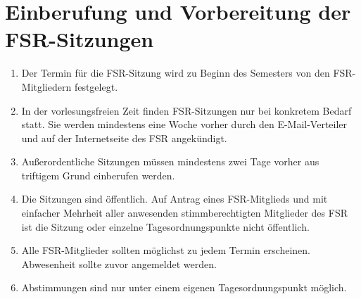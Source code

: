 \documentclass[
	a4paper,
	12pt,
	oneside,
	parskip=half-,
	pagesize,
	headsepline,
	german,
	ngerman
]{scrartcl}
\begin{document}
\section{Einberufung und Vorbereitung der FSR-Sitzungen}
\begin{enumerate}
	\item Der Termin für die FSR-Sitzung wird zu Beginn des Semesters von den FSR-Mitgliedern festgelegt.
	\item In der vorlesungsfreien Zeit finden FSR-Sitzungen nur bei konkretem Bedarf statt. Sie werden mindestens eine Woche vorher durch den E-Mail-Verteiler und auf der Internetseite des FSR angekündigt.
	\item Außerordentliche Sitzungen müssen mindestens zwei Tage vorher aus triftigem Grund einberufen werden. 
	\item Die Sitzungen sind öffentlich. Auf Antrag eines FSR-Mitglieds und mit einfacher Mehrheit aller anwesenden stimmberechtigten Mitglieder des FSR ist die Sitzung oder einzelne Tagesordnungspunkte nicht öffentlich.
	\item Alle FSR-Mitglieder sollten möglichst zu jedem Termin erscheinen. Abwesenheit sollte zuvor angemeldet werden.
	\item Abstimmungen sind nur unter einem eigenen Tagesordnungspunkt möglich.
\end{enumerate}
\end{document}
